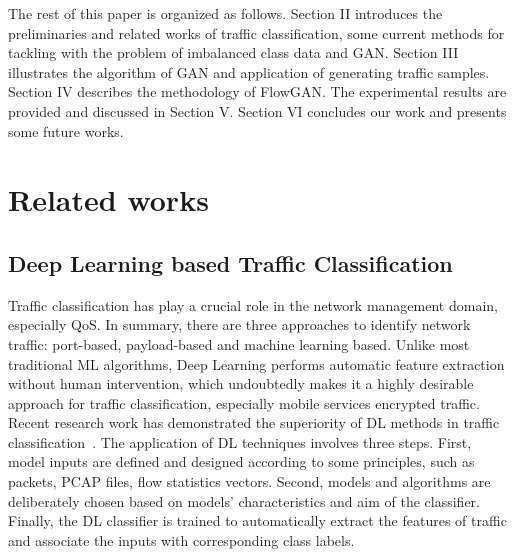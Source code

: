 \documentclass[letterpaper,12pt]{article}
\begin{document}
The rest of this paper is organized as follows. Section II introduces the preliminaries and related works of traffic classification, some current methods for tackling with the problem of imbalanced class data and GAN. Section III illustrates the algorithm of GAN and application of generating traffic samples. Section IV describes the methodology of FlowGAN. The experimental results are provided and discussed in Section V. Section VI  concludes our work and presents some future works.
 


\section{Related works}\label{sec:preliminaries}
\subsection{Deep Learning based Traffic Classification}
Traffic classification has play a crucial role in the network management  domain, especially QoS. In summary, there are three approaches to identify network traffic: port-based, payload-based and machine learning based. Unlike most traditional ML algorithms, Deep Learning performs automatic feature extraction without human intervention, which undoubtedly makes it a highly desirable approach for traffic classification, especially mobile services encrypted traffic. Recent research work has demonstrated the superiority of DL methods in traffic classification~\cite{MobileTC-2018,Datanet,Wang-1D-CNN,IoT-CNN-2017,HierarchicalTC}. The application of DL techniques involves three steps. First, model inputs are defined and designed according to some principles, such as packets, PCAP files, flow statistics vectors. Second, models and algorithms are deliberately chosen based on models' characteristics and aim of the classifier. Finally, the DL classifier is trained to automatically extract the features of traffic and associate the inputs with corresponding class labels.
\end{document}
